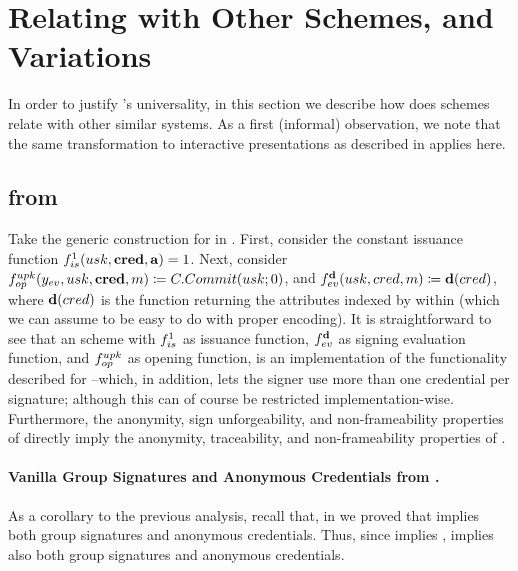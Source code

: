 \section{Relating \UAS with Other Schemes, and Variations}
\label{ssec:transformations}

In order to justify \UAS's universality, in this section we describe how does
\UAS schemes relate with other similar systems. 
%
As a first (informal) observation, we note that the same transformation to
interactive presentations as described in \GSAC applies here.

\subsection{\GSAC from \UAS}
Take the generic construction for \UAS in .
First, consider the constant issuance function $f_{is}^1(usk,\mathbf{cred},\mathbf{a}) =
1$. Next, consider $f_{op}^{upk}(y_{ev},usk,\mathbf{cred},m) \coloneqq
C.Commit(usk;0)$, and $f_{ev}^{\mathbf{d}}(usk,cred,m) \coloneqq \mathbf{d}(cred)$,
where $\mathbf{d}(cred)$ is the function returning the attributes indexed by
\dattrs within \cred (which we can assume to be easy to do with proper
encoding). It is straightforward to see that an \UAS scheme with $f_{is}^1$
as issuance function, $f_{ev}^{\mathbf{d}}$ as signing evaluation function, and
$f_{op}^{upk}$ as opening function, is an implementation of the functionality
described for \GSAC --which, in addition, lets the signer use more than one
credential per signature; although this can of course be restricted
implementation-wise.
%
Furthermore, the anonymity, sign unforgeability, and non-frameability properties
of \UAS directly imply the anonymity, traceability, and non-frameability
properties of \GSAC.

\paragraph{Vanilla Group Signatures and Anonymous Credentials from \UAS.} As a
corollary to the previous analysis, recall that, in 
we proved that \GSAC implies both group signatures and anonymous credentials.
Thus, since \UAS implies \GSAC, \UAS implies also both group signatures and
anonymous credentials.

